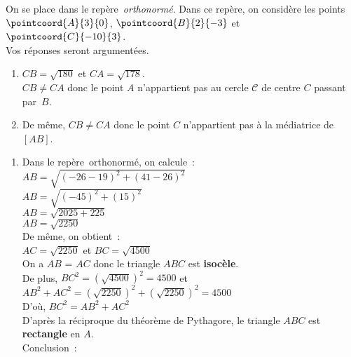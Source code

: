 \vspace*{-2em}

\newpage

\begin{minipage}{0.45\textwidth}
\thispagestyle{correction1}

\vspace*{1em}

\exercice
On se place dans le repère~\emph{orthonormé}. Dans ce repère, on considère les points $\pointcoord{A}{3}{0}$, $\pointcoord{B}{2}{-3}$ et $\pointcoord{C}{-10}{3}$.\\Vos réponses seront argumentées.

	\begin{enumerate}
		\item $CB = \sqrt{180}$ et $CA = \sqrt{178}$.\\
				$CB \neq CA$ donc le point $A$ n'appartient pas au cercle $\mathscr{C}$ de centre $C$ passant par~$B$.
		\item De même, $CB \neq CA$ donc le point $C$ n'appartient pas à la médiatrice de $\left[AB\right]$.
	\end{enumerate}

\exercice
\begin{enumerate}
	\item Dans le repère~orthonormé, on calcule~:\\ $AB=\sqrt{\left(-26 - 19 \right) ^ 2 + \left(41 - 26 \right) ^ 2}$\\
			$AB=\sqrt{\left(-45 \right) ^ 2 + \left(15 \right) ^ 2}$\\
			$AB=\sqrt{2025 + 225}$\\
			$AB=\sqrt{2250}$\\[1em]
			De même, on obtient~:\\ $AC = \sqrt{2250}$ et $BC = \sqrt{4500}$\\[1em]
			On a $AB$ = $AC$ donc le triangle $ABC$ est \textbf{isocèle}.\\[1em]
			De plus, $BC^2 = \left(\sqrt{4500}\right)^2 = 4500$ et\\ $AB^2 + AC^2 = \left(\sqrt{2250}\right)^2 + \left(\sqrt{2250}\right)^2 = 4500$\\[1em]
			D'où, $BC^2 = AB^2 + AC^2$\\[1em]
			D'après la réciproque du théorème de Pythagore, le triangle $ABC$ est \textbf{rectangle} en $A$.\\[1em]
			Conclusion~: \\
\end{enumerate}


\end{minipage}


